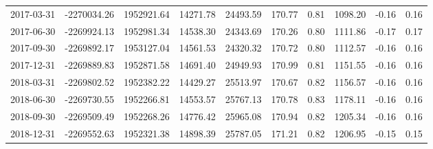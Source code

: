 \begin{landscape}
\begin{longtable}{llllllllll}
2017-03-31 & -2270034.26 & 1952921.64 & 14271.78 & 24493.59 & 170.77 & 0.81 & 1098.20 & -0.16 & 0.16 \\
2017-06-30 & -2269924.13 & 1952981.34 & 14538.30 & 24343.69 & 170.26 & 0.80 & 1111.86 & -0.17 & 0.17 \\
2017-09-30 & -2269892.17 & 1953127.04 & 14561.53 & 24320.32 & 170.72 & 0.80 & 1112.57 & -0.16 & 0.16 \\
2017-12-31 & -2269889.83 & 1952871.58 & 14691.40 & 24949.93 & 170.99 & 0.81 & 1151.55 & -0.16 & 0.16 \\
2018-03-31 & -2269802.52 & 1952382.22 & 14429.27 & 25513.97 & 170.67 & 0.82 & 1156.57 & -0.16 & 0.16 \\
2018-06-30 & -2269730.55 & 1952266.81 & 14553.57 & 25767.13 & 170.78 & 0.83 & 1178.11 & -0.16 & 0.16 \\
2018-09-30 & -2269509.49 & 1952268.26 & 14776.42 & 25965.08 & 170.94 & 0.82 & 1205.34 & -0.16 & 0.16 \\
2018-12-31 & -2269552.63 & 1952321.38 & 14898.39 & 25787.05 & 171.21 & 0.82 & 1206.95 & -0.15 & 0.15

\end{longtable}
\end{landscape}